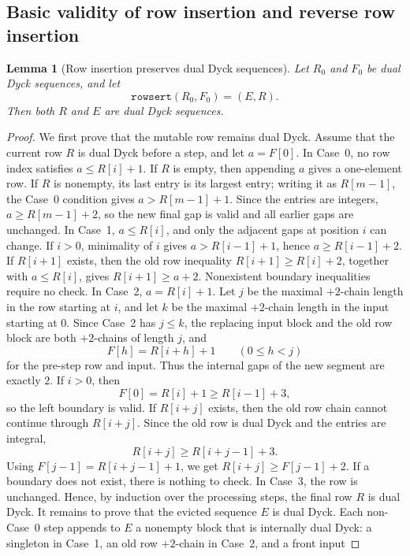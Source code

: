 \documentclass[11pt]{article}
\theoremstyle{plain}
\newtheorem{lemma}[theorem]{Lemma}
\theoremstyle{definition}
\theoremstyle{remark}
\newcommand{\rowsert}{\texttt{rowsert}}
\begin{document}
\subsection{Basic validity of row insertion and reverse row insertion}
\begin{lemma}[Row insertion preserves dual Dyck sequences]
\label{lem:rowsert-dual-dyck}
Let \(R_0\) and \(F_0\) be dual Dyck sequences, and let
\[
  \rowsert(R_0,F_0)=(E,R).
\]
Then both \(R\) and \(E\) are dual Dyck sequences.
\end{lemma}
\begin{proof}
We first prove that the mutable row remains dual Dyck.  Assume that the current
row \(R\) is dual Dyck before a step, and let \(a=F[0]\).
In Case~0, no row index satisfies \(a\le R[i]+1\).  If \(R\) is empty, then
appending \(a\) gives a one-element row.  If \(R\) is nonempty, its last entry
is its largest entry; writing it as \(R[m-1]\), the Case~0 condition gives
\(a>R[m-1]+1\).  Since the entries are integers, \(a\ge R[m-1]+2\), so the new
final gap is valid and all earlier gaps are unchanged.
In Case~1, \(a\le R[i]\), and only the adjacent gaps at position \(i\) can
change.  If \(i>0\), minimality of \(i\) gives \(a>R[i-1]+1\), hence
\(a\ge R[i-1]+2\).  If \(R[i+1]\) exists, then the old row inequality
\(R[i+1]\ge R[i]+2\), together with \(a\le R[i]\), gives
\(R[i+1]\ge a+2\).  Nonexistent boundary inequalities require no check.
In Case~2, \(a=R[i]+1\).  Let \(j\) be the maximal \(+2\)-chain length in the
row starting at \(i\), and let \(k\) be the maximal \(+2\)-chain length in the
input starting at \(0\).  Since Case~2 has \(j\le k\), the replacing input block
and the old row block are both \(+2\)-chains of length \(j\), and
\[
  F[h]=R[i+h]+1 \qquad (0\le h<j)
\]
for the pre-step row and input.  Thus the internal gaps of the new segment are
exactly \(2\).  If \(i>0\), then
\[
  F[0]=R[i]+1\ge R[i-1]+3,
\]
so the left boundary is valid.  If \(R[i+j]\) exists, then the old row chain
cannot continue through \(R[i+j]\).  Since the old row is dual Dyck and the
entries are integral,
\[
  R[i+j]\ge R[i+j-1]+3.
\]
Using \(F[j-1]=R[i+j-1]+1\), we get \(R[i+j]\ge F[j-1]+2\).  If a boundary does
not exist, there is nothing to check.  In Case~3, the row is unchanged.  Hence,
by induction over the processing steps, the final row \(R\) is dual Dyck.
It remains to prove that the evicted sequence \(E\) is dual Dyck.  Each
non-Case~0 step appends to \(E\) a nonempty block that is internally dual Dyck:
a singleton in Case~1, an old row \(+2\)-chain in Case~2, and a front input

\end{proof}
\end{document}

